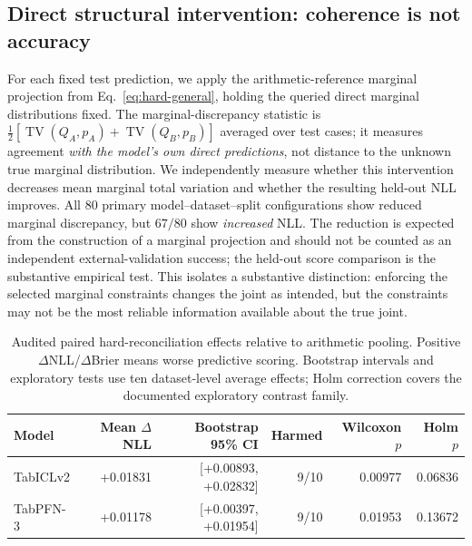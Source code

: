 \documentclass[a4paper,fleqn]{cas-sc}
\newcommand{\TV}{\operatorname{TV}}
\begin{document}
\subsection{Direct structural intervention: coherence is not accuracy}
\label{sec:ablation}
For each fixed test prediction, we apply the arithmetic-reference marginal projection from Eq.~\eqref{eq:hard-general}, holding the queried direct marginal distributions fixed. The marginal-discrepancy statistic is $\tfrac12[\TV(Q_A,p_A)+\TV(Q_B,p_B)]$ averaged over test cases; it measures agreement \emph{with the model's own direct predictions}, not distance to the unknown true marginal distribution. We independently measure whether this intervention decreases mean marginal total variation and whether the resulting held-out NLL improves. All $80$ primary model--dataset--split configurations show reduced marginal discrepancy, but $67/80$ show \emph{increased} NLL. The reduction is expected from the construction of a marginal projection and should not be counted as an independent external-validation success; the held-out score comparison is the substantive empirical test. This isolates a substantive distinction: enforcing the selected marginal constraints changes the joint as intended, but the constraints may not be the most reliable information available about the true joint.

\begin{table}[t]
\centering
\caption{Audited paired hard-reconciliation effects relative to arithmetic pooling. Positive $\Delta$NLL/$\Delta$Brier means worse predictive scoring. Bootstrap intervals and exploratory tests use ten dataset-level average effects; Holm correction covers the documented exploratory contrast family.}
\label{tab:newablation}
\small
\begin{tabular}{lrrrrr}
\toprule
Model & Mean $\Delta$NLL & Bootstrap 95\% CI & Harmed & Wilcoxon $p$ & Holm $p$\\
\midrule
TabICLv2 & +0.01831 & [+0.00893, +0.02832] & 9/10 & 0.00977 & 0.06836\\
TabPFN-3 & +0.01178 & [+0.00397, +0.01954] & 9/10 & 0.01953 & 0.13672\\
\bottomrule
\end{tabular}
\normalsize
\end{table}
\end{document}
